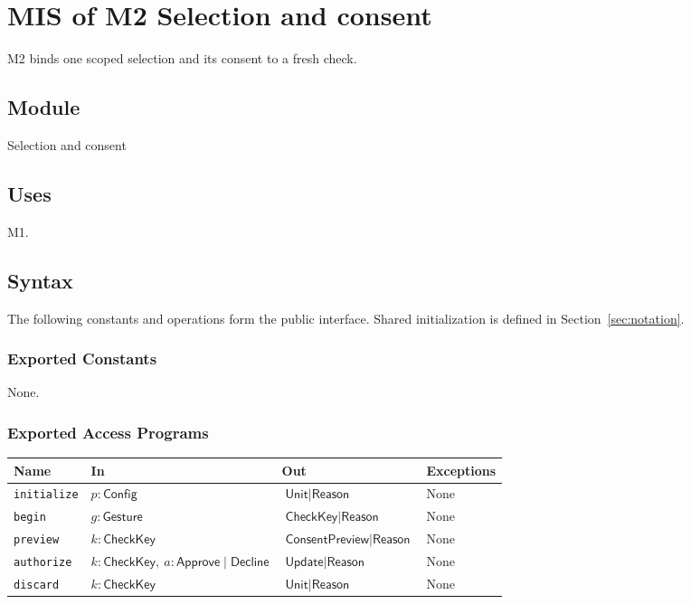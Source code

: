 \documentclass[12pt, titlepage]{article}
\newcommand{\ty}[1]{\textsf{#1}}
\newcommand{\key}{\ty{CheckKey}}
\begin{document}
\clearpage
\section{MIS of M2 Selection and consent} \label{sec:m2}

M2 binds one scoped selection and its consent to a fresh check.

\subsection{Module}

Selection and consent

\subsection{Uses}

M1.

\subsection{Syntax}

The following constants and operations form the public interface. Shared initialization is defined in Section~\ref{sec:notation}.

\subsubsection{Exported Constants}

None.

\subsubsection{Exported Access Programs}

\begin{center}
\begin{tabular}{p{3.3cm} p{4cm} p{4cm} p{2.4cm}}
\hline
\textbf{Name} & \textbf{In} & \textbf{Out} & \textbf{Exceptions} \\
\hline
\texttt{initialize} & $p:\ty{Config}$ & $\ty{Unit}\mid\ty{Reason}$ & None \\
\texttt{begin} & $g:\ty{Gesture}$ & $\key\mid\ty{Reason}$ & None \\
\texttt{preview} & $k:\key$ & $\ty{ConsentPreview}\mid\ty{Reason}$ & None \\
\texttt{authorize} & $k:\key,\ a:\ty{Approve}\mid\ty{Decline}$ & $\ty{Update}\mid\ty{Reason}$ & None \\
\texttt{discard} & $k:\key$ & $\ty{Unit}\mid\ty{Reason}$ & None \\
\hline
\end{tabular}
\end{center}
\end{document}
